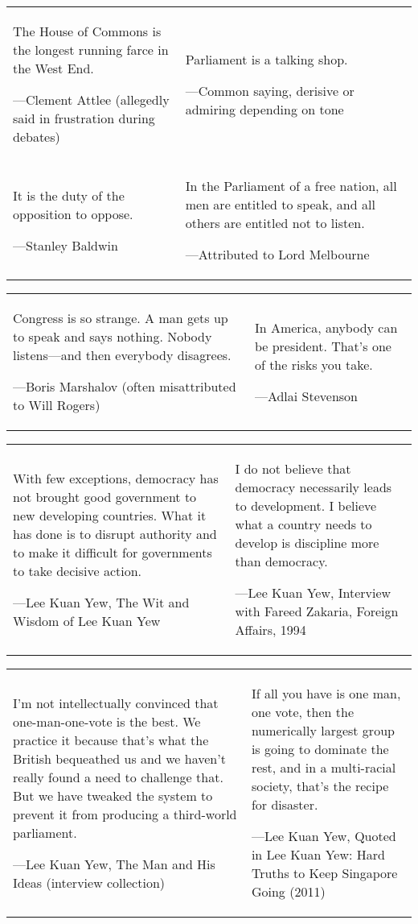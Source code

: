 \begin{table}[H]
\centering
\small
\begin{tabular}{p{}p{}}
\epigraph{The House of Commons is the longest running farce in the West End.}{---Clement Attlee (allegedly said in frustration during debates)} &
\epigraph{Parliament is a talking shop.}{---Common saying, derisive or admiring depending on tone} \\
\epigraph{It is the duty of the opposition to oppose.}{---Stanley Baldwin} &
\epigraph{In the Parliament of a free nation, all men are entitled to speak, and all others are entitled not to listen.}{---Attributed to Lord Melbourne} \\
\end{tabular}
\end{table}

\begin{table}[H]
\centering
\small
\begin{tabular}{p{}p{}}
\epigraph{Congress is so strange. A man gets up to speak and says nothing. Nobody listens—and then everybody disagrees.}{---Boris Marshalov (often misattributed to Will Rogers)} &
\epigraph{In America, anybody can be president. That's one of the risks you take.}{---Adlai Stevenson} \\
\end{tabular}
\end{table}

\begin{table}[H]
\centering
\small
\begin{tabular}{p{}p{}}
\epigraph{With few exceptions, democracy has not brought good government to new developing countries. What it has done is to disrupt authority and to make it difficult for governments to take decisive action.}{---Lee Kuan Yew, The Wit and Wisdom of Lee Kuan Yew} &
\epigraph{I do not believe that democracy necessarily leads to development. I believe what a country needs to develop is discipline more than democracy.}{---Lee Kuan Yew, Interview with Fareed Zakaria, Foreign Affairs, 1994} \\
\end{tabular}
\end{table}

\begin{table}[H]
\centering
\small
\begin{tabular}{p{}p{}}
\epigraph{I'm not intellectually convinced that one-man-one-vote is the best. We practice it because that's what the British bequeathed us and we haven't really found a need to challenge that. But we have tweaked the system to prevent it from producing a third-world parliament.}{---Lee Kuan Yew, The Man and His Ideas (interview collection)} &
\epigraph{If all you have is one man, one vote, then the numerically largest group is going to dominate the rest, and in a multi-racial society, that's the recipe for disaster.}{---Lee Kuan Yew, Quoted in Lee Kuan Yew: Hard Truths to Keep Singapore Going (2011)} \\
\end{tabular}
\end{table}


